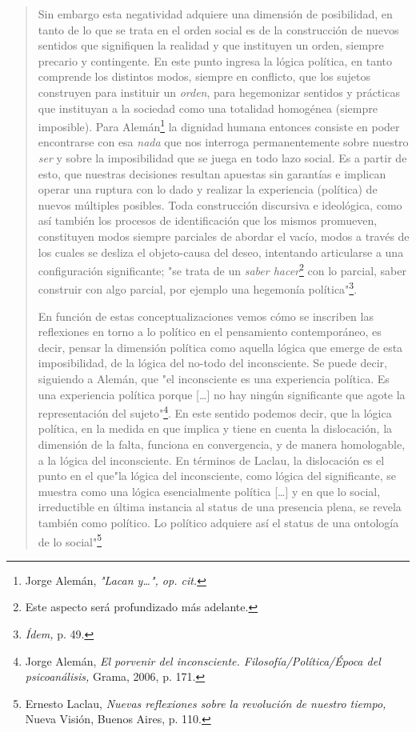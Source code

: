 \documentclass{book}
\begin{document}
\begin{quote}
Sin embargo esta negatividad adquiere una dimensión de posibilidad, en
tanto de lo que se trata en el orden social es de la construcción de
nuevos sentidos que signifiquen la realidad y que instituyen un orden,
siempre precario y contingente. En este punto ingresa la lógica
política, en tanto comprende los distintos modos, siempre en conflicto,
que los sujetos construyen para instituir un \emph{orden}, para
hegemonizar sentidos y prácticas que instituyan a la sociedad como una
totalidad homogénea (siempre imposible). Para Alemán\footnote{Jorge
  Alemán, \emph{"Lacan y\ldots", op. cit.}} la dignidad humana entonces
consiste en poder encontrarse con esa \emph{nada} que nos interroga
permanentemente sobre nuestro \emph{ser} y sobre la imposibilidad que se
juega en todo lazo social. Es a partir de esto, que nuestras decisiones
resultan apuestas sin garantías e implican operar una ruptura con lo
dado y realizar la experiencia (política) de nuevos múltiples posibles.
Toda construcción discursiva e ideológica, como así también los procesos
de identificación que los mismos promueven, constituyen modos siempre
parciales de abordar el vacío, modos a través de los cuales se desliza
el objeto-causa del deseo, intentando articularse a una configuración
significante; "se trata de un \emph{saber hacer}\footnote{Este aspecto
  será profundizado más adelante.} con lo parcial, saber construir con
algo parcial, por ejemplo una hegemonía política"\footnote{\emph{Ídem,}
  p. 49.}.

En función de estas conceptualizaciones vemos cómo se inscriben las
reflexiones en torno a lo político en el pensamiento contemporáneo, es
decir, pensar la dimensión política como aquella lógica que emerge de
esta imposibilidad, de la lógica del no-todo del inconsciente. Se puede
decir, siguiendo a Alemán, que "el inconsciente es una experiencia
política. Es una experiencia política porque {[}\ldots{]} no hay ningún
significante que agote la representación del sujeto"\footnote{Jorge
  Alemán, \emph{El porvenir del inconsciente. Filosofía/Política/Época
  del psicoanálisis,} Grama, 2006, p. 171.}. En este sentido podemos
decir, que la lógica política, en la medida en que implica y tiene en
cuenta la dislocación, la dimensión de la falta, funciona en
convergencia, y de manera homologable, a la lógica del inconsciente. En
términos de Laclau, la dislocación es el punto en el que"la lógica del
inconsciente, como lógica del significante, se muestra como una lógica
esencialmente política {[}\ldots{]} y en que lo social, irreductible en
última instancia al status de una presencia plena, se revela también
como político. Lo político adquiere así el status de una ontología de lo
social"\footnote{Ernesto Laclau, \emph{Nuevas reflexiones sobre la
  revolución de nuestro tiempo,} Nueva Visión, Buenos Aires, p. 110.}
\end{quote}
\end{document}
